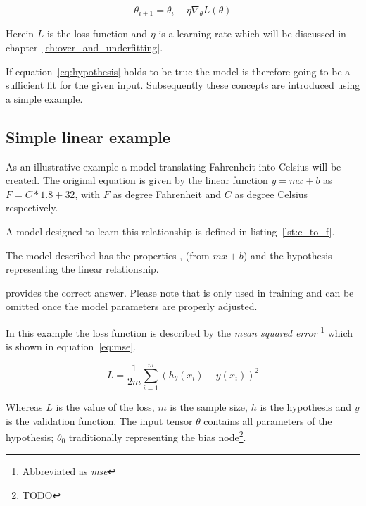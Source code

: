 \begin{equation} \label{eq:gradient_descent}
\theta_{i+1} = \theta_i - \eta \nabla_\theta L(\theta)
\end{equation}

Herein $L$ is the loss function and $\eta$ is a learning rate which will be discussed in
chapter~\ref{ch:over_and_underfitting}.

If equation~\eqref{eq:hypothesis} holds to be true the model is therefore going to be a sufficient
fit for the given input. Subsequently these concepts are introduced using a simple example.

\subsection{Simple linear example} \label{ch:simple_linear_example} %

As an illustrative example a model translating Fahrenheit into Celsius will be created.
The original equation is given by the linear function $y = mx + b$
as $F = C * 1.8 + 32$, with $F$ as degree Fahrenheit and $C$ as degree Celsius
respectively.

A model designed to learn this relationship is defined in listing~\ref{lst:c_to_f}.



The model described has the properties
,  (from $mx + b$) and the hypothesis representing the linear relationship.

 provides the correct answer. Please note that  is only used in training
and can be omitted once the model parameters are properly adjusted.

In this example the loss function is described by the \textit{mean squared error }
\footnote{ Abbreviated as \textit{mse} } which is shown in equation~\eqref{eq:mse}.

\begin{equation} \label{eq:mse}
L = \frac{1}{2 m} \sum_{i=1}^{m} (h_\theta(x_i) - y(x_i))^2
\end{equation}

Whereas $L$ is the value of the loss, $m$ is the sample size, $h$ is
the hypothesis and $y$ is the validation function.
The input tensor $\theta$ contains all parameters of the hypothesis;
$\theta_0$ traditionally representing the bias node\footnote{ TODO }.

